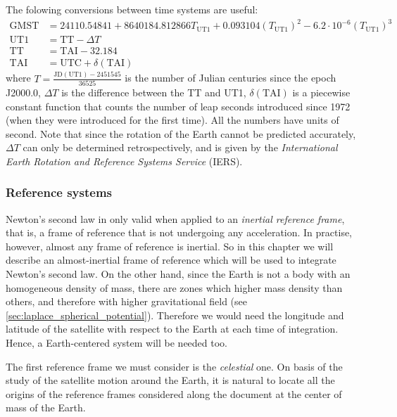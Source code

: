 \documentclass[../main.tex]{subfiles}
\begin{document}
The folowing conversions between time systems are useful:
\begin{align*}
  \text{GMST} & =24110.54841+8640184.812866{T_\text{UT1}}+0.093104{(T_\text{UT1})}^2-6.2\cdot 10^{-6}{(T_\text{UT1})}^3 \\
  \text{UT1}  & =\text{TT}-\Delta T                                                                                     \\
  \text{TT}   & =\text{TAI}-32.184                                                                                      \\
  \text{TAI}  & =\text{UTC}+\delta(\text{TAI})
\end{align*}
where $ T=\frac{\text{JD}(\text{UT1})-2451545}{36525}$ is the number of Julian centuries since the epoch J2000.0, $\Delta T$ is the difference between the TT and UT1, $\delta(\text{TAI})$ is a piecewise constant function that counts the number of leap seconds introduced since 1972 (when they were introduced for the first time). All the numbers have units of second. Note that since the rotation of the Earth cannot be predicted accurately, $\Delta T$ can only be determined retrospectively, and is given by the \emph{International Earth Rotation and Reference Systems Service} (IERS).
\subsubsection{Reference systems}\label{sec:reference_systems}
Newton's second law in only valid when applied to an \emph{inertial reference frame}, that is, a frame of reference that is not undergoing any acceleration. In practise, however, almost any frame of reference is inertial. So in this chapter we will describe an almost-inertial frame of reference which will be used to integrate Newton's second law. On the other hand, since the Earth is not a body with an homogeneous density of mass, there are zones which higher mass density than others, and therefore with higher gravitational field (see \cref{sec:laplace_spherical_potential}). Therefore we would need the longitude and latitude of the satellite with respect to the Earth at each time of integration. Hence, a Earth-centered system will be needed too.

The first reference frame we must consider is the \emph{celestial} one. On basis of the study of the satellite motion around the Earth, it is natural to locate all the origins of the reference frames considered along the document at the center of mass of the Earth.
\end{document}

